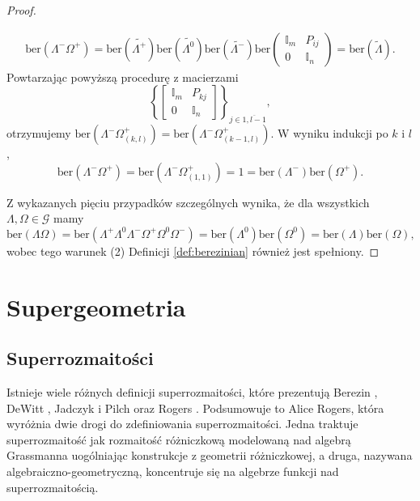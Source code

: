 \documentclass[11pt,a4paper]{report}
\theoremstyle{definition}
\newcommand{\ber}{\mathrm{ber}}
\newcommand{\I}{\mathbb{I}}
\begin{document}
\begin{proof}
\begin{enumerate}[1)]
\begin{enumerate}[5.1)]
\begin{equation*}
			\begin{gathered}
				\ber(\Lambda^-\Omega^+) = \ber(\tilde{\Lambda^+}) \ber(\tilde{\Lambda^0}) \ber(\tilde{\Lambda^-}) \ber\left(\begin{matrix}
				\I_m & P_{ij} \\
				0 & \I_n 
				\end{matrix}\right)= \ber(\tilde{\Lambda}).
			\end{gathered}
		\end{equation*}
		Powtarzając powyższą procedurę z macierzami $$\left\{ \begin{bmatrix}
		\I_m & P_{kj} \\
		0 & \I_n 
		\end{bmatrix} \right\}_{j \in \overline{1,l-1}},$$ otrzymujemy $\ber \left(\Lambda^-\Omega^+_{(k,l)} \right) = \ber \left(\Lambda^-\Omega^+_{(k-1,l)} \right)$. W wyniku indukcji po $k$ i $l$,
		$$\ber(\Lambda^-\Omega^+) = \ber \left( \Lambda^-\Omega^+_{(1,1)} \right) =1 =  \ber(\Lambda^-) \ber(\Omega^+).$$
	\end{enumerate}
	\end{enumerate}
	Z wykazanych pięciu przypadków szczególnych wynika, że dla wszystkich $\Lambda, \Omega \in \mathcal{G}$ mamy
	$$\ber(\Lambda \Omega) = \ber(\Lambda^{+} \Lambda^0 \Lambda^{-} \Omega^{+} \Omega^0 \Omega^{-}) = \ber(\Lambda^0) \ber(\Omega^0) = \ber(\Lambda) \ber(\Omega),$$
	wobec tego warunek (2) Definicji \ref{def:berezinian} również jest spełniony.
\end{proof} 

\chapter{Supergeometria}

\section{Superrozmaitości}

Istnieje wiele różnych definicji superrozmaitości, które prezentują Berezin \cite{berezin}, DeWitt \cite{dewitt}, Jadczyk i Pilch \cite{jadczyk} oraz Rogers \cite{rogers}. Podsumowuje to Alice Rogers, która wyróżnia dwie drogi do zdefiniowania superrozmaitości. Jedna traktuje superrozmaitość jak rozmaitość różniczkową modelowaną nad algebrą Grassmanna uogólniając konstrukcje z geometrii różniczkowej, a druga, nazywana algebraiczno-geometryczną, koncentruje się na algebrze funkcji nad superrozmaitością.
\end{document}

